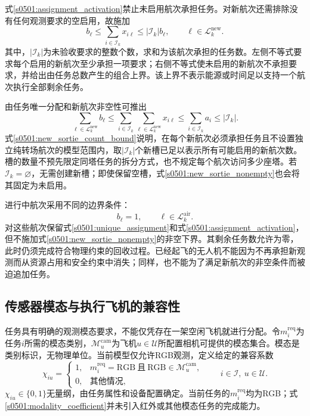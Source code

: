 式\eqref{s0501:assignment_activation}禁止未启用航次承担任务。对新航次还需排除没有任何观测要求的空启用，故施加
\begin{equation}
 b_\ell\le
 \sum_{i\in\mathcal I_k}x_{i\ell}
 \le |\mathcal I_k|b_\ell,
 \qquad \ell\in\mathcal L_k^{\mathrm{new}}.
 \label{s0501:new_sortie_nonempty}
\end{equation}
其中，$|\mathcal I_k|$为未验收要求的整数个数，求和为该航次承担的任务数。左侧不等式要求每个启用的新航次至少承担一项要求；右侧不等式使未启用的新航次不承担要求，并给出由任务总数产生的组合上界。该上界不表示能源或时间足以支持一个航次执行全部剩余任务。

由任务唯一分配和新航次非空性可推出
\begin{equation}
 \sum_{\ell\in\mathcal L_k^{\mathrm{new}}}b_\ell
 \le
 \sum_{i\in\mathcal I_k}
 \sum_{\ell\in\mathcal L_k^{\mathrm{new}}}x_{i\ell}
 \le
 \sum_{i\in\mathcal I_k}a_i
 \le |\mathcal I_k|.
 \label{s0501:new_sortie_count_bound}
\end{equation}
式\eqref{s0501:new_sortie_count_bound}说明，在每个新航次必须承担任务且不设置独立纯转场航次的模型范围内，取$|\mathcal I_k|$个新槽已足以表示所有可能启用的新航次数。槽的数量不预先限定同塔任务的拆分方式，也不规定每个航次访问多少座塔。若$\mathcal I_k=\varnothing$，无需创建新槽；即使保留空槽，式\eqref{s0501:new_sortie_nonempty}也会将其固定为未启用。

进行中航次采用不同的边界条件：
\begin{equation}
 b_\ell=1,\qquad \ell\in\mathcal L_k^{\mathrm{air}}.
 \label{s0501:ongoing_sortie_active}
\end{equation}
对这些航次保留式\eqref{s0501:unique_assignment}和式\eqref{s0501:assignment_activation}，但不施加式\eqref{s0501:new_sortie_nonempty}的非空下界。其剩余任务数允许为零，此时仍须完成符合物理约束的回收过程。已经起飞的无人机不能因为不再承担新观测而从资源占用和安全约束中消失；同样，也不能为了满足新航次的非空条件而被迫追加任务。

\subsection{传感器模态与执行飞机的兼容性}

任务具有明确的观测模态要求，不能仅凭存在一架空闲飞机就进行分配。令$m_i^{\mathrm{req}}$为任务$i$所需的模态类别，$\mathcal M_u^{\mathrm{cam}}$为飞机$u\in\mathcal U$所配置相机可提供的模态集合。模态是类别标识，无物理单位。当前模型仅允许RGB观测，定义给定的兼容系数
\begin{equation}
 \chi_{iu}=
 \begin{cases}
 1, & m_i^{\mathrm{req}}=\mathrm{RGB}
      \ \text{且}\ \mathrm{RGB}\in\mathcal M_u^{\mathrm{cam}},\\
 0, & \text{其他情况},
 \end{cases}
 \qquad i\in\mathcal I,\ u\in\mathcal U.
 \label{s0501:modality_coefficient}
\end{equation}
$\chi_{iu}\in\{0,1\}$无量纲，由任务属性和设备配置确定。当前任务的$m_i^{\mathrm{req}}$均为RGB；式\eqref{s0501:modality_coefficient}并未引入红外或其他模态任务的完成能力。

